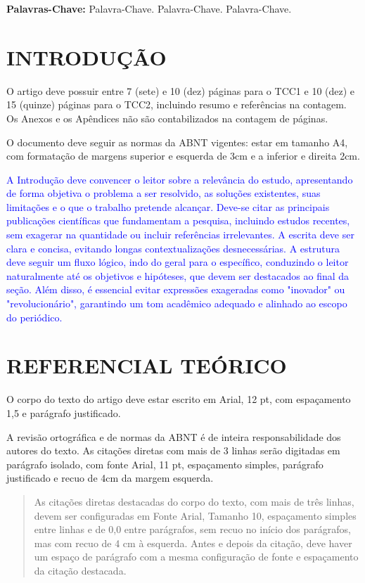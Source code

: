 \documentclass[a4paper,12pt]{article}
\begin{document}
\noindent\textbf{Palavras-Chave:} Palavra-Chave. Palavra-Chave. Palavra-Chave.

\section{INTRODUÇÃO}

O artigo deve possuir entre 7 (sete) e 10 (dez) páginas para o TCC1 e 10
(dez) e 15 (quinze) páginas para o TCC2, incluindo resumo e referências na
contagem. Os Anexos e os Apêndices não são contabilizados na contagem de
páginas.

O documento deve seguir as normas da ABNT vigentes: estar em tamanho A4, com
formatação de margens superior e esquerda de 3cm e a inferior e direita 2cm.

\textcolor{blue}{
A Introdução deve convencer o leitor sobre a relevância do estudo, apresentando
de forma objetiva o problema a ser resolvido, as soluções existentes, suas
limitações e o que o trabalho pretende alcançar. Deve-se citar as principais
publicações científicas que fundamentam a pesquisa, incluindo estudos recentes,
sem exagerar na quantidade ou incluir referências irrelevantes. A escrita deve
ser clara e concisa, evitando longas contextualizações desnecessárias.
A estrutura deve seguir um fluxo lógico, indo do geral para o específico,
conduzindo o leitor naturalmente até os objetivos e hipóteses, que devem ser
destacados ao final da seção. Além disso, é essencial evitar expressões
exageradas como "inovador" ou "revolucionário", garantindo um tom acadêmico
adequado e alinhado ao escopo do periódico.
}

\section{REFERENCIAL TEÓRICO}
O corpo do texto do artigo deve estar escrito em Arial, 12 pt, com espaçamento
1,5 e parágrafo justificado.

A revisão ortográfica e de normas da ABNT é de inteira responsabilidade dos
autores do texto. As citações diretas com mais de 3 linhas serão digitadas em
parágrafo isolado, com fonte Arial, 11 pt, espaçamento simples, parágrafo
justificado e recuo de 4cm da margem esquerda.

\begin{quote}
\leftskip=4cm
\rightskip=-1cm
\noindent\fontsize{10pt}{12pt}\selectfont
As citações diretas destacadas do corpo do texto, com mais de três linhas,
devem ser configuradas em Fonte Arial, Tamanho 10, espaçamento simples entre
linhas e de 0,0 entre parágrafos, sem recuo no início dos parágrafos, mas com
recuo de 4 cm à esquerda. Antes e depois da citação, deve haver um espaço de
parágrafo com a mesma configuração de fonte e espaçamento da citação destacada.
\end{quote}
\end{document}
